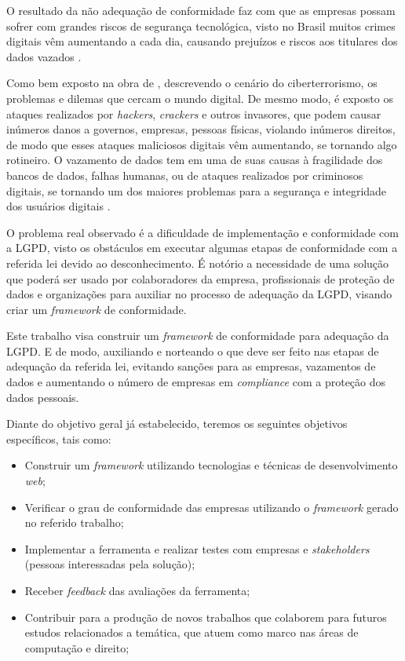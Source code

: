 \documentclass[
	12pt,				%
	openright,			%
	oneside,			%
	a4paper,			%
	english,			%
	french,				%
	spanish,			%
	brazil,				%
	]{abntex2}
\begin{document}
O resultado da não adequação de conformidade faz com que as empresas possam sofrer com grandes riscos de segurança tecnológica, visto no Brasil muitos crimes digitais vêm aumentando a cada dia, causando prejuízos e riscos aos titulares dos dados vazados \cite{Diogo2021}. 

Como bem exposto na obra de , descrevendo o cenário do ciberterrorismo,  os problemas e dilemas que cercam o mundo digital. De mesmo modo, é exposto os ataques realizados por \textit{hackers}, \textit{crackers} e outros invasores, que podem causar inúmeros danos a governos, empresas, pessoas físicas, violando inúmeros direitos, de modo que esses ataques maliciosos digitais vêm aumentando, se tornando algo rotineiro. 
O vazamento de dados tem em uma de suas causas à fragilidade dos bancos de dados, falhas humanas, ou de ataques realizados por criminosos digitais, se tornando um dos maiores problemas para a segurança e integridade dos usuários digitais \cite{01-06-Dodsworth2021}.

O problema real observado é a dificuldade de implementação e conformidade com a LGPD, visto os obstáculos em executar algumas etapas de conformidade com a referida lei devido ao desconhecimento. É notório a necessidade de uma solução que poderá ser usado por colaboradores da empresa, profissionais de proteção de dados e organizações para auxiliar no processo de adequação da LGPD, visando criar um \textit{framework} de conformidade. 

Este trabalho visa construir um \textit{framework} de conformidade para adequação da LGPD. E de modo, auxiliando e norteando o que deve ser feito nas etapas de adequação da referida lei, evitando sanções para as empresas, vazamentos de dados e aumentando o número de empresas em \textit{compliance} com a proteção dos dados pessoais.

Diante do objetivo geral já estabelecido, teremos os seguintes objetivos específicos, tais como:
\begin{itemize}
\item Construir um \textit{framework} utilizando tecnologias e técnicas de desenvolvimento \textit{web};
\item Verificar o grau de conformidade das empresas utilizando o \textit{framework} gerado no referido trabalho;
\item Implementar a ferramenta e realizar testes com empresas e \textit{stakeholders} (pessoas interessadas pela solução);
\item Receber \textit{feedback} das avaliações da ferramenta;
\item Contribuir para a produção de novos trabalhos que colaborem para futuros estudos relacionados a temática, que atuem como marco nas áreas de computação e direito;
\end{itemize}
\end{document}
